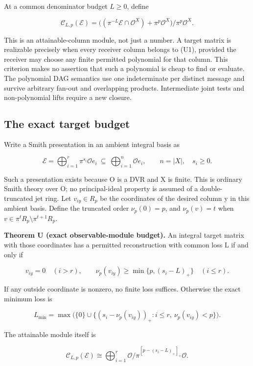 \documentclass[11pt,a4paper]{article}
\begin{document}
At a common denominator budget \(L\ge0\), define

\[
 \mathcal C_{L,p}(\mathcal E)=
 \big((\pi^{-L}\mathcal E\cap\mathcal O^X)+\pi^p\mathcal O^X\big)
                /\pi^p\mathcal O^X. \tag{U1}
\]

This is an attainable-column module, not just a number. A target matrix
is realizable precisely when every receiver column belongs to (U1),
provided the receiver may choose any finite permitted polynomial for
that column. This criterion makes no assertion that such a polynomial is
cheap to find or evaluate. The polynomial DAG semantics use one
indeterminate per distinct message and survive arbitrary fan-out and
overlapping products. Intermediate joint tests and non-polynomial lifts
require a new closure.

\subsection{The exact target budget}\label{v8-the-exact-target-budget}

Write a Smith presentation in an ambient integral basis as

\[
 \mathcal E=\bigoplus_{i=1}^{r}\pi^{s_i}\mathcal O e_i
 \ \subseteq\ \bigoplus_{i=1}^{n}\mathcal O e_i,
 \qquad n=|X|,\quad s_i\ge0. \tag{U2}
\]

Such a presentation exists because O is a DVR and X is finite. This is
ordinary Smith theory over O; no principal-ideal property is assumed of
a double-truncated jet ring. Let \(v_{iy}\in R_p\) be the coordinates of
the desired column y in this ambient basis. Define the truncated order
\(\nu_p(0)=p\), and \(\nu_p(v)=t\) when
\(v\in\pi^tR_p\setminus\pi^{t+1}R_p\).

\textbf{Theorem U (exact observable-module budget).} An integral target
matrix with those coordinates has a permitted reconstruction with common
loss L if and only if

\[
 v_{iy}=0\quad(i>r),\qquad
 \nu_p(v_{iy})\ge\min\{p,(s_i-L)_+\}\quad(i\le r). \tag{U3}
\]

If any outside coordinate is nonzero, no finite loss suffices. Otherwise
the exact minimum loss is

\[
 L_{\min}=\max\bigl(\{0\}\cup
     \{(s_i-\nu_p(v_{iy}))_+:i\le r,\ \nu_p(v_{iy})<p\}\bigr).
 \tag{U4}
\]

The attainable module itself is

\[
 \mathcal C_{L,p}(\mathcal E)\cong
 \bigoplus_{i=1}^{r}
 \mathcal O/\pi^{[p-(s_i-L)_+]_+}\mathcal O. \tag{U5}
\]
\end{document}
